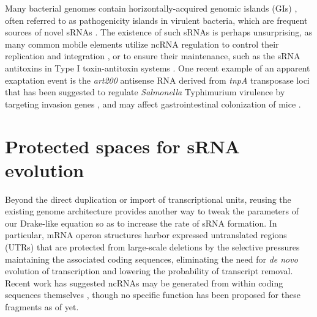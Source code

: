 Many bacterial genomes contain horizontally-acquired genomic islands (GIs) \citep{Dobrindt2004-as}, often referred to as pathogenicity islands in virulent bacteria, which are frequent sources of novel sRNAs \citep{Pichon2005-de,Padalon-Brauch2008-gh,Tree2014-wj}. The existence of such sRNAs is perhaps unsurprising, as many common mobile elements utilize ncRNA regulation to control their replication and integration \citep{Wagner1994-oj}, or to ensure their maintenance, such as the sRNA antitoxins in Type I toxin-antitoxin systems \citep{Brantl2012-ad}. One recent example of an apparent exaptation event is the \textit{art200} antisense RNA derived from \textit{tnpA} transposase loci that has been suggested to regulate \textit{Salmonella} Typhimurium virulence by targeting invasion genes \citep{Ellis2017-uv}, and may affect gastrointestinal colonization of mice \citep{Ellis2018-kf}. \par

\section{Protected spaces for sRNA evolution}

Beyond the direct duplication or import of transcriptional units, reusing the existing genome architecture provides another way to tweak the parameters of our Drake-like equation so as to increase the rate of sRNA formation. In particular, mRNA operon structures harbor expressed untranslated regions (UTRs) that are protected from large-scale deletions by the selective pressures maintaining the associated coding sequences, eliminating the need for \textit{de novo} evolution of transcription and lowering the probability of transcript removal. Recent work has suggested ncRNAs may be generated from within coding sequences themselves \citep{Dar2018-jq}, though no specific function has been proposed for these fragments as of yet.\par

